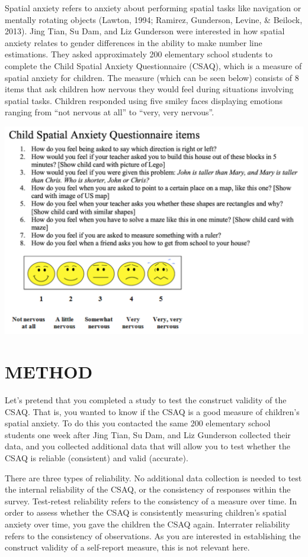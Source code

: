\documentclass[
]{book}
\begin{document}
Spatial anxiety refers to anxiety about performing spatial tasks like navigation or mentally rotating objects (Lawton, 1994; Ramirez, Gunderson, Levine, \& Beilock, 2013). Jing Tian, Su Dam, and Liz Gunderson were interested in how spatial anxiety relates to gender differences in the ability to make number line estimations. They asked approximately 200 elementary school students to complete the Child Spatial Anxiety Questionnaire (CSAQ), which is a measure of spatial anxiety for children. The measure (which can be seen below) consists of 8 items that ask children how nervous they would feel during situations involving spatial tasks. Children responded using five smiley faces displaying emotions ranging from ``not nervous at all'' to ``very, very nervous''.

\includegraphics{img/4.a.png}

\hypertarget{method-2}{%
\section{METHOD}\label{method-2}}

Let's pretend that you completed a study to test the construct validity of the CSAQ. That is, you wanted to know if the CSAQ is a good measure of children's spatial anxiety. To do this you contacted the same 200 elementary school students one week after Jing Tian, Su Dam, and Liz Gunderson collected their data, and you collected additional data that will allow you to test whether the CSAQ is reliable (consistent) and valid (accurate).

There are three types of reliability. No additional data collection is needed to test the internal reliability of the CSAQ, or the consistency of responses within the survey. Test-retest reliability refers to the consistency of a measure over time. In order to assess whether the CSAQ is consistently measuring children's spatial anxiety over time, you gave the children the CSAQ again. Interrater reliability refers to the consistency of observations. As you are interested in establishing the construct validity of a self-report measure, this is not relevant here.
\end{document}
